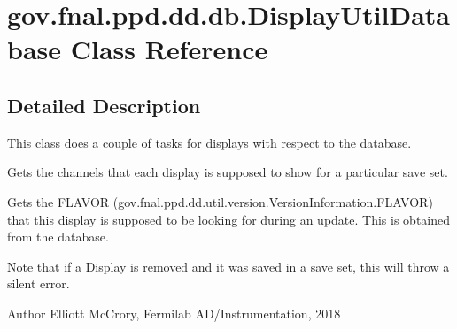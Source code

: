 \hypertarget{classgov_1_1fnal_1_1ppd_1_1dd_1_1db_1_1DisplayUtilDatabase}{\section{gov.\-fnal.\-ppd.\-dd.\-db.\-Display\-Util\-Database Class Reference}
\label{classgov_1_1fnal_1_1ppd_1_1dd_1_1db_1_1DisplayUtilDatabase}
}


\subsection{Detailed Description}
This class does a couple of tasks for displays with respect to the database. 
\begin{DoxyEnumerate}
\item Gets the channels that each display is supposed to show for a particular save set. 
\item Gets the F\-L\-A\-V\-O\-R (gov.\-fnal.\-ppd.\-dd.\-util.\-version.\-Version\-Information.\-F\-L\-A\-V\-O\-R) that this display is supposed to be looking for during an update. This is obtained from the database. 
\end{DoxyEnumerate}

Note that if a Display is removed and it was saved in a save set, this will throw a silent error.

\begin{DoxyAuthor}{Author}
Elliott Mc\-Crory, Fermilab A\-D/\-Instrumentation, 2018 
\end{DoxyAuthor}

